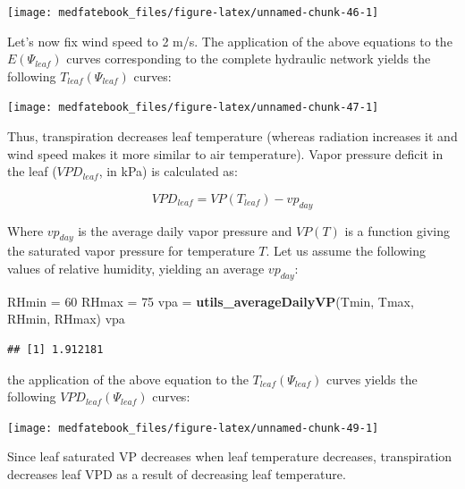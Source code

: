 \documentclass[]{book}
\newenvironment{Shaded}{\begin{snugshade}}{\end{snugshade}}
\newcommand{\KeywordTok}[1]{\textcolor[rgb]{0.13,0.29,0.53}{\textbf{#1}}}
\newcommand{\DecValTok}[1]{\textcolor[rgb]{0.00,0.00,0.81}{#1}}
\newcommand{\StringTok}[1]{\textcolor[rgb]{0.31,0.60,0.02}{#1}}
\newcommand{\NormalTok}[1]{#1}
\begin{document}
\begin{center}\texttt{[image: medfatebook\_files/figure-latex/unnamed-chunk-46-1]} \end{center}

Let's now fix wind speed to 2 m/s. The application of the above
equations to the \(E(\Psi_{leaf})\) curves corresponding to the complete
hydraulic network yields the following \(T_{leaf}(\Psi_{leaf})\) curves:

\begin{center}\texttt{[image: medfatebook\_files/figure-latex/unnamed-chunk-47-1]} \end{center}

Thus, transpiration decreases leaf temperature (whereas radiation
increases it and wind speed makes it more similar to air temperature).
Vapor pressure deficit in the leaf (\(VPD_{leaf}\), in kPa) is
calculated as:

\begin{equation}
VPD_{leaf} = VP(T_{leaf})-vp_{day}
\end{equation}

Where \(vp_{day}\) is the average daily vapor pressure and \(VP(T)\) is
a function giving the saturated vapor pressure for temperature \(T\).
Let us assume the following values of relative humidity, yielding an
average \(vp_{day}\):

\begin{Shaded}
\begin{Highlighting}[]
\NormalTok{RHmin =}\StringTok{ }\DecValTok{60}
\NormalTok{RHmax =}\StringTok{ }\DecValTok{75}
\NormalTok{vpa =}\StringTok{ }\KeywordTok{utils_averageDailyVP}\NormalTok{(Tmin, Tmax, RHmin, RHmax)}
\NormalTok{vpa}
\end{Highlighting}
\end{Shaded}

\begin{verbatim}
## [1] 1.912181
\end{verbatim}

the application of the above equation to the \(T_{leaf}(\Psi_{leaf})\)
curves yields the following \(VPD_{leaf}(\Psi_{leaf})\) curves:

\begin{center}\texttt{[image: medfatebook\_files/figure-latex/unnamed-chunk-49-1]} \end{center}

Since leaf saturated VP decreases when leaf temperature decreases,
transpiration decreases leaf VPD as a result of decreasing leaf
temperature.
\end{document}
